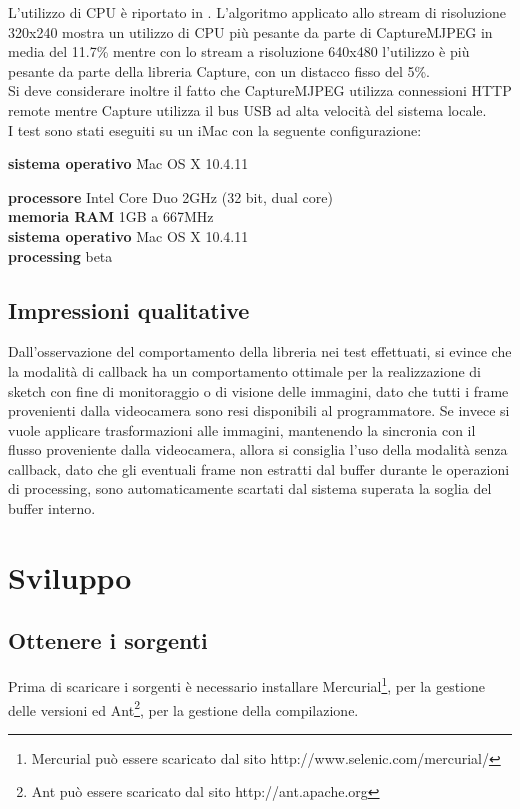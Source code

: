 \documentclass[a4paper,11pt]{article}
\begin{document}
L'utilizzo di CPU è riportato in .
L'algoritmo applicato allo stream di risoluzione 320x240 mostra un
utilizzo di CPU più pesante da parte di CaptureMJPEG in media del
11.7\% mentre con lo stream a risoluzione 640x480 l'utilizzo è più
pesante da parte della libreria Capture, con un distacco fisso del
5\%.\\
Si deve considerare inoltre il fatto che CaptureMJPEG utilizza
connessioni HTTP remote mentre Capture utilizza il bus USB ad alta
velocità del sistema locale.\\

I test sono stati eseguiti su un iMac con la seguente configurazione:
\begin{tabbing}
  \textbf{sistema operativo} \= Mac OS X 10.4.11 \kill

  \textbf{processore} \>Intel Core Duo 2GHz (32 bit, dual core)\\
  \textbf{memoria RAM} \> 1GB a 667MHz \\
  \textbf{sistema operativo} \> Mac OS X 10.4.11 \\
  \textbf{processing}  beta \\
\end{tabbing}


\subsection{Impressioni qualitative}
\label{sec:impressioni}
Dall'osservazione del comportamento della libreria nei test effettuati,
si evince che la modalit\`a di callback ha un comportamento ottimale per la
realizzazione di sketch con fine di monitoraggio o di visione delle immagini,
dato che tutti i frame provenienti dalla videocamera sono resi disponibili
al programmatore. Se invece si vuole applicare trasformazioni alle immagini,
mantenendo la sincronia con il flusso proveniente dalla videocamera, allora
si consiglia l'uso della modalit\`a senza callback, dato che gli eventuali
frame non estratti dal buffer durante le operazioni di processing,
sono automaticamente scartati dal sistema superata la soglia del
buffer interno.

\section{Sviluppo}
\label{sec:sviluppo}
\subsection{Ottenere i sorgenti}
\label{sec:sorgenti}
Prima di scaricare i sorgenti è necessario installare
Mercurial\footnote{Mercurial può essere scaricato dal sito
 http://www.selenic.com/mercurial/}, 
per la gestione delle versioni ed Ant\footnote{Ant può essere scaricato
dal sito http://ant.apache.org}, 
per la gestione della compilazione.
\end{document}
